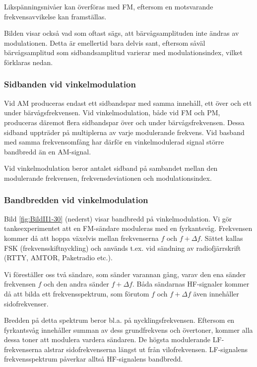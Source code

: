 Likspänningsnivåer kan överföras med FM, eftersom en motsvarande
frekvensavvikelse kan framställas.

Bilden visar också vad som oftast sägs, att bärvågsamplituden inte ändras av
modulationen.
Detta är emellertid bara delvis sant, eftersom såväl bärvågsamplitud som
sidbandsamplitud varierar med modulationsindex, vilket förklaras nedan.

\subsubsection{Sidbanden vid vinkelmodulation}

Vid AM produceras endast ett sidbandspar med samma innehåll, ett över och ett
under bärvågsfrekvensen.
Vid vinkelmodulation, både vid FM och PM, produceras däremot flera sidbandspar
över och under bärvågsfrekvensen.
Dessa sidband uppträder på multiplerna av varje modulerande frekvens.
Vid basband med samma frekvensomfång har därför en vinkelmodulerad signal
större bandbredd än en AM-signal.

Vid vinkelmodulation beror antalet sidband på sambandet mellan den modulerande
frekvensen, frekvensdeviationen och modulationsindex.

\subsubsection{Bandbredden vid vinkelmodulation}

Bild \ref{fig:BildII1-30} (nederst) visar bandbredd på vinkelmodulation.
Vi gör tankeexperimentet att en FM-sändare moduleras med en fyrkantsvåg.
Frekvensen kommer då att hoppa växelvis mellan frekvenserna \(f\) och
\(f + \Delta f\).
Sättet kallas FSK (frekvensskiftnyckling) och används t.ex. vid sändning av
radiofjärrskrift (RTTY, AMTOR, Paketradio etc.).

Vi föreställer oss två sändare, som sänder varannan gång, varav den ena sänder
frekvensen \(f\) och den andra sänder \(f + \Delta f\).
Båda sändarnas HF-signaler kommer då att bilda ett frekvensspektrum, som
förutom \(f\) och \(f + \Delta f\) även innehåller sidofrekvenser.

Bredden på detta spektrum beror bl.a. på nycklingsfrekvensen.
Eftersom en fyrkantsvåg innehåller summan av dess grundfrekvens och övertoner,
kommer alla dessa toner att modulera vardera sändaren.
De högsta modulerande LF-frekvenserna alstrar sidofrekvenserna längst ut från
vilofrekvensen.
LF-signalens frekvensspektrum påverkar alltså HF-signalens bandbredd.

